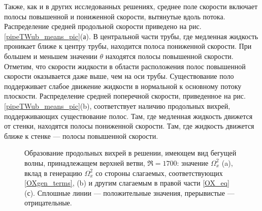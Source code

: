 Также, как и в других исследованных решениях, среднее поле скорости включает полосы повышенной и пониженной скорости, вытянутые вдоль потока. Распределение средней продольной скорости приведено на рис. \eqref{pipeTWub_means_pic}(а). В центральной части трубы, где медленная жидкость проникает ближе к центру трубы, находится полоса пониженной скорости. При большем и меньшем значении $\theta$ находятся полосы повышенной скорости. Отметим, что скорости жидкости в области расположения полос повышенной скорости оказывается даже выше, чем на оси трубы. Существование поло поддерживает слабое движение жидкости в нормальной к основному потоку плоскости. Распределение средней поперечной скорости, приведенное на рис. \ref{pipeTWub_means_pic}(b), соответствует наличию продольных вихрей, поддерживающих существование полос. Там, где медленная жидкость движется от стенки, находятся полосы пониженной скорости. Там, где жидкость движется ближе к стенке --- полосы повышенной скорости. 

\begin{figure}
\caption{Образование продольных вихрей в решении, имеющем вид бегущей волны, принадлежащем верхней ветви, $\Re = 1700$: значение $\Omega_x^2$ (a), вклад в генерацию $\Omega_x^2$ со стороны слагаемых, соответствующих \eqref{OXgen_terms}, (b) и другим слагаемым в правой части \eqref{OX_eq} (с). Сплошные линии --- положительные значения, прерывистые --- отрицательные.}
\label{pipeTWub_OXgen_pic}
\end{figure}

